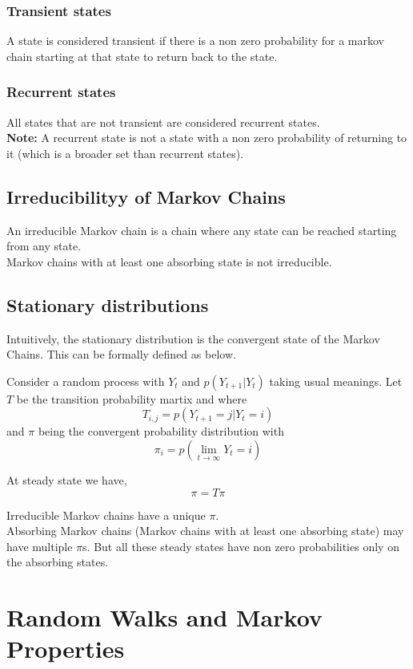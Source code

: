 \documentclass[a4paper]{article}
\begin{document}
\subsubsection{Transient states}
A state is considered transient if there is a non zero probability for a markov chain starting at that state to return back to the state.

\subsubsection{Recurrent states}
All states that are not transient are considered recurrent states.\\
\textbf{Note: } A recurrent state is not a state with a non zero probability of returning to it (which is a broader set than recurrent states). 

\subsection{Irreducibilityy of Markov Chains}
An irreducible Markov chain is a chain where any state can be reached starting from any state.\\
Markov chains with at least one absorbing state is not irreducible.


\subsection{Stationary distributions}
Intuitively, the stationary distribution is the convergent state of the Markov Chains. This can be formally defined as below.

Consider a random process with $Y_t$ and $p(Y_{t+1} | Y_t)$ taking usual meanings. Let $T$ be the transition probability martix and where 
$$T_{i,j} = p(Y_{t+1}=j | Y_{t}=i)$$ and $\pi$ being the convergent probability distribution with $$\pi_i = p(\lim_{t \to \infty} Y_{t}=i)$$

At steady state we have,
$$\pi = T\pi$$

Irreducible Markov chains have a unique $\pi$.\\
Absorbing Markov chains (Markov chains with at least one absorbing state) may have multiple $\pi$s. But all these steady states have non zero probabilities only on the absorbing states.\\


\section{Random Walks and Markov Properties}
\end{document}
